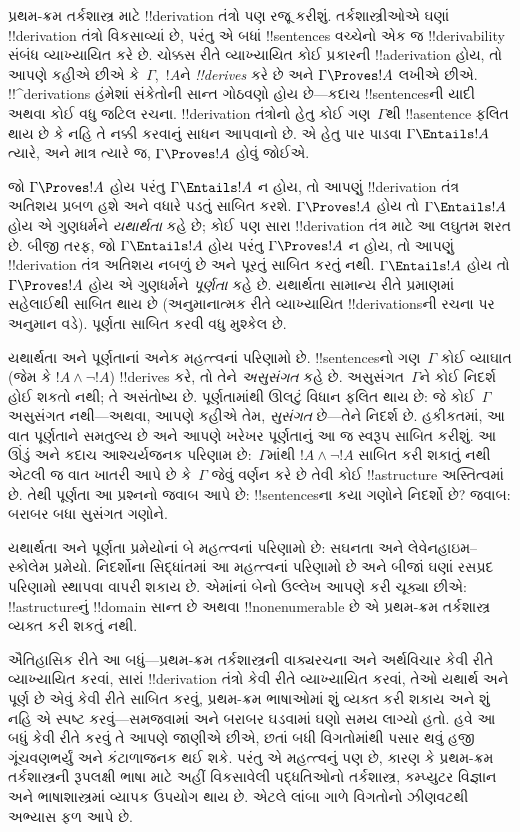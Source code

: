 \documentclass[../../../include/open-logic-section]{subfiles}
\begin{document}


પ્રથમ-ક્રમ તર્કશાસ્ત્ર માટે !!{derivation} તંત્રો પણ રજૂ કરીશું.
તર્કશાસ્ત્રીઓએ ઘણાં !!{derivation} તંત્રો વિકસાવ્યાં છે, પરંતુ એ બધાં
!!{sentence}s વચ્ચેનો એક જ !!{derivability} સંબંધ વ્યાખ્યાયિત કરે છે.
ચોક્કસ રીતે વ્યાખ્યાયિત કોઈ પ્રકારની !!a{derivation} હોય, તો આપણે
કહીએ છીએ કે~$\Gamma$,~$!A$ને \emph{!!{derive}s} કરે છે અને
$\Gamma \Proves !A$ લખીએ છીએ. !!^{derivation}s હંમેશાં સંકેતોની
સાન્ત ગોઠવણો હોય છે---કદાચ !!{sentence}sની યાદી અથવા કોઈ વધુ જટિલ
રચના. !!{derivation} તંત્રોનો હેતુ કોઈ ગણ~$\Gamma$થી !!a{sentence}
ફલિત થાય છે કે નહિ તે નક્કી કરવાનું સાધન આપવાનો છે. એ હેતુ પાર પાડવા
$\Gamma \Entails !A$ ત્યારે, અને માત્ર ત્યારે જ, $\Gamma \Proves !A$
હોવું જોઈએ.

જો $\Gamma \Proves !A$ હોય પરંતુ $\Gamma \Entails !A$ ન હોય, તો
આપણું !!{derivation} તંત્ર અતિશય પ્રબળ હશે અને વધારે પડતું સાબિત કરશે.
$\Gamma \Proves !A$ હોય તો $\Gamma \Entails !A$ હોય એ ગુણધર્મને
\emph{યથાર્થતા} કહે છે; કોઈ પણ સારા !!{derivation} તંત્ર માટે આ લઘુતમ
શરત છે. બીજી તરફ, જો $\Gamma \Entails !A$ હોય પરંતુ $\Gamma \Proves
!A$ ન હોય, તો આપણું !!{derivation} તંત્ર અતિશય નબળું છે અને પૂરતું
સાબિત કરતું નથી. $\Gamma \Entails !A$ હોય તો $\Gamma \Proves !A$
હોય એ ગુણધર્મને \emph{પૂર્ણતા} કહે છે. યથાર્થતા સામાન્ય રીતે પ્રમાણમાં
સહેલાઈથી સાબિત થાય છે (અનુમાનાત્મક રીતે વ્યાખ્યાયિત
!!{derivation}sની રચના પર અનુમાન વડે). પૂર્ણતા સાબિત કરવી વધુ મુશ્કેલ
છે.

યથાર્થતા અને પૂર્ણતાનાં અનેક મહત્ત્વનાં પરિણામો છે. !!{sentence}sનો
ગણ~$\Gamma$ કોઈ વ્યાઘાત (જેમ કે $!A \land \lnot !A$) !!{derive}s કરે,
તો તેને \emph{અસુસંગત} કહે છે. અસુસંગત~$\Gamma$ને કોઈ નિદર્શ હોઈ
શકતો નથી; તે અસંતોષ્ય છે. પૂર્ણતામાંથી ઊલટું વિધાન ફલિત થાય છે: જે
કોઈ~$\Gamma$ અસુસંગત નથી---અથવા, આપણે કહીએ તેમ,
\emph{સુસંગત} છે---તેને નિદર્શ છે. હકીકતમાં, આ વાત પૂર્ણતાને સમતુલ્ય
છે અને આપણે ખરેખર પૂર્ણતાનું આ જ સ્વરૂપ સાબિત કરીશું. આ ઊંડું અને
કદાચ આશ્ચર્યજનક પરિણામ છે:~$\Gamma$માંથી $!A \land \lnot !A$ સાબિત
કરી શકાતું નથી એટલી જ વાત ખાતરી આપે છે કે~$\Gamma$ જેવું વર્ણન કરે
છે તેવી કોઈ !!a{structure} અસ્તિત્વમાં છે. તેથી પૂર્ણતા આ પ્રશ્નનો
જવાબ આપે છે: !!{sentence}sના કયા ગણોને નિદર્શો છે? જવાબ: બરાબર બધા
સુસંગત ગણોને.

યથાર્થતા અને પૂર્ણતા પ્રમેયોનાં બે મહત્ત્વનાં પરિણામો છે: સઘનતા અને
લેવેનહાઇમ--સ્કોલેમ પ્રમેયો. નિદર્શોના સિદ્ધાંતમાં આ મહત્ત્વનાં
પરિણામો છે અને બીજાં ઘણાં રસપ્રદ પરિણામો સ્થાપવા વાપરી શકાય છે. એમાંનાં
બેનો ઉલ્લેખ આપણે કરી ચૂક્યા છીએ: !!a{structure}નું !!{domain} સાન્ત છે
અથવા !!{nonenumerable} છે એ પ્રથમ-ક્રમ તર્કશાસ્ત્ર વ્યક્ત કરી શકતું
નથી.

ઐતિહાસિક રીતે આ બધું---પ્રથમ-ક્રમ તર્કશાસ્ત્રની વાક્યરચના અને
અર્થવિચાર કેવી રીતે વ્યાખ્યાયિત કરવાં, સારાં !!{derivation} તંત્રો
કેવી રીતે વ્યાખ્યાયિત કરવાં, તેઓ યથાર્થ અને પૂર્ણ છે એવું કેવી રીતે
સાબિત કરવું, પ્રથમ-ક્રમ ભાષાઓમાં શું વ્યક્ત કરી શકાય અને શું નહિ એ
સ્પષ્ટ કરવું---સમજવામાં અને બરાબર ઘડવામાં ઘણો સમય લાગ્યો હતો. હવે આ
બધું કેવી રીતે કરવું તે આપણે જાણીએ છીએ, છતાં બધી વિગતોમાંથી પસાર થવું
હજી ગૂંચવણભર્યું અને કંટાળાજનક થઈ શકે. પરંતુ એ મહત્ત્વનું પણ છે,
કારણ કે પ્રથમ-ક્રમ તર્કશાસ્ત્રની રૂપલક્ષી ભાષા માટે અહીં વિકસાવેલી
પદ્ધતિઓનો તર્કશાસ્ત્ર, કમ્પ્યુટર વિજ્ઞાન અને ભાષાશાસ્ત્રમાં વ્યાપક
ઉપયોગ થાય છે. એટલે લાંબા ગાળે વિગતોનો ઝીણવટથી અભ્યાસ ફળ આપે છે.
\end{document}
